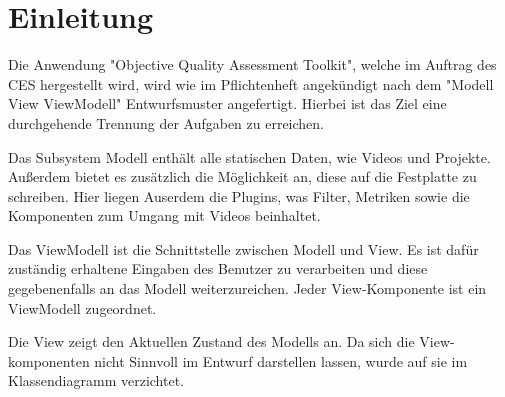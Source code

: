 \chapter{Einleitung}

Die Anwendung "Objective Quality Assessment Toolkit", welche im Auftrag des CES hergestellt wird, wird wie im Pflichtenheft angekündigt nach dem "Modell View ViewModell" Entwurfsmuster angefertigt.
Hierbei ist das Ziel eine durchgehende Trennung der Aufgaben zu erreichen.

Das Subsystem Modell enthält alle statischen Daten, wie Videos und Projekte. Außerdem bietet es zusätzlich die Möglichkeit an, diese auf die Festplatte zu schreiben. Hier liegen Auserdem die Plugins, was Filter, Metriken sowie die Komponenten zum Umgang mit Videos beinhaltet.

Das ViewModell ist die Schnittstelle zwischen Modell und View. Es ist  dafür zuständig erhaltene Eingaben des Benutzer zu verarbeiten und diese gegebenenfalls an das Modell weiterzureichen. Jeder View-Komponente ist ein ViewModell zugeordnet.

Die View zeigt den Aktuellen Zustand des Modells an. Da sich die View-komponenten nicht Sinnvoll im Entwurf darstellen lassen, wurde auf sie im Klassendiagramm verzichtet.